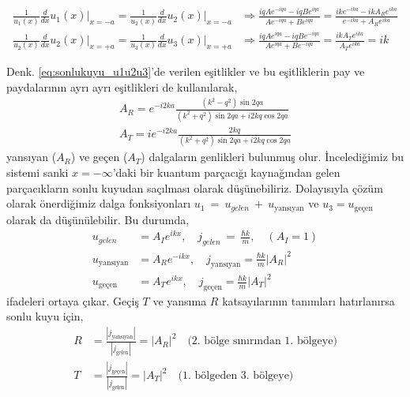 \documentclass[a4paper,12pt, twoside]{article}
\begin{document}
\begin{align}
\frac{1}{u_1(x)} \frac{d}{d x}u_1(x)\bigg|_{x=-a} = \frac{1}{u_2(x)} \frac{d}{d x}u_2(x)\bigg|_{x=-a}  &\Longrightarrow \frac{i q A e^{-i q a}-i q B e^{i q a}}{A e^{-i q a}+B e^{i q a}}=\frac{i k e^{-i k a}-i k A_R e^{i k a}}{e^{-i k a}+ A_R e^{i k a}} \nonumber\\
\frac{1}{u_2(x)} \frac{d}{d x}u_2(x)\bigg|_{x=+a} = \frac{1}{u_3(x)} \frac{d}{d x}u_3(x)\bigg|_{x=+a} &\Longrightarrow \frac{i q A e^{i q a}-i q B e^{-i q a}}{A e^{i q a}+B e^{-i q a}}=\frac{i k A_T e^{i k a}}{A_T e^{i k a}}=i k
\label{eq:sonlukuyu_u1u2u3}
\end{align}

Denk. \ref{eq:sonlukuyu_u1u2u3}'de verilen eşitlikler ve bu eşitliklerin pay ve paydalarının ayrı ayrı eşitlikleri de kullanılarak,
\begin{align}
{A_R= e^{-i 2 k a} \frac{\left(k^{2}-q^{2}\right) \sin 2 q a}{\left(k^{2}+q^{2}\right) \sin 2 q a + i 2 k q \cos 2 q a}} \\ 
{A_T= i e^{-i 2 k a} \frac{2 k q}{\left(k^{2}+q^{2}\right) \sin 2 q a + i 2 k q \cos 2 q a}}
\end{align}
yansıyan ($A_R$) ve geçen ($A_T$) dalgaların genlikleri bulunmuş olur. İncelediğimiz bu sistemi sanki $x = -\infty$'daki bir kuantum parçacığı kaynağından gelen parçacıkların sonlu kuyudan saçılması olarak düşünebiliriz. Dolayısıyla çözüm olarak önerdiğimiz dalga fonksiyonları $u_1~=~u_{gelen}~+~u_\text{yansıyan}$ ve $u_3 = u_\text{geçen}$ olarak da düşünülebilir. Bu durumda,
\begin{align}
u_{gelen} &= A_I e^{i k x}, \quad j_{gelen}~=~\frac{\hbar k} {m}, \quad (A_I = 1)\\
u_\text{yansıyan} &= A_R e^{-i k x}, \quad j_\text{yansıyan} = \frac{\hbar k} {m} |A_R|^2\\
u_\text{geçen} &= A_T e^{i k x}, \quad j_\text{geçen} = \frac{\hbar k} {m} |A_T|^2
\end{align}
ifadeleri ortaya çıkar. Geçiş $T$ ve yansıma $R$ katsayılarının tanımları hatırlanırsa sonlu kuyu için,
\begin{align}
R &= \frac{|j_\text{yansıyan}|}{|j_\text{gelen}|} = |A_R|^2 \quad \text{(2. bölge sınırından 1. bölgeye)}\\
T &= \frac{|j_\text{geçen}|}{|j_\text{gelen}|} = |A_T|^2  \quad \text{(1. bölgeden 3. bölgeye)}
\end{align}
\end{document}
